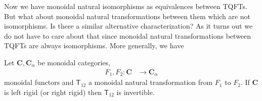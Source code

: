Now we have monoidal natural isomorphisms as equivalences between TQFTs. But what about monoidal natural transformations between them which are not isomorphisms. Is there a similar alternative characterization? As it turns out we do not have to care about that since monoidal natural transformations between TQFTs are always isomorphisms. More generally, we have
\\
\begin{thm}
\label{thm:mntiso}
Let $\mathbf{C}, \mathbf{C}_{\alpha}$ be monoidal categories,
\begin{align*}
  F_{1}
  ,
  F_{2}
  \colon
  \mathbf{C}
  &\to
  \mathbf{C}_{\alpha}
\end{align*}
monoidal functors and $\mathsf{T}_{12}$ a monoidal natural transformation from $F_{1}$ to $F_{2}$. If $\mathbf{C}$ is left rigid (or right rigid) then $\mathsf{T}_{12}$ is invertible.
\end{thm}
